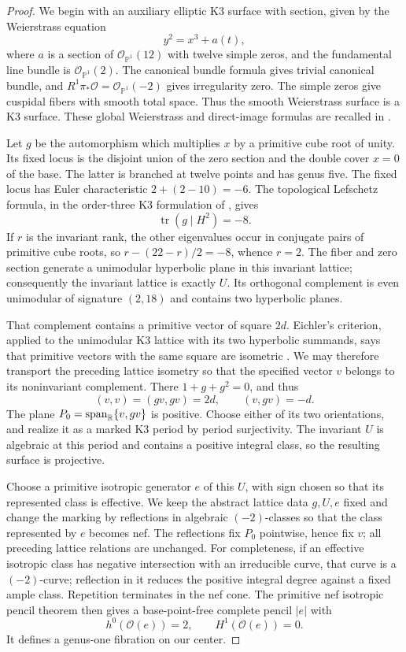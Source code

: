 \begin{proof}
We begin with an auxiliary elliptic K3 surface with section, given by
the Weierstrass equation
\[
 y^2=x^3+a(t),
\]
where $a$ is a section of $\mathcal O_{\mathbb P^1}(12)$ with twelve
simple zeros, and the fundamental line bundle is
$\mathcal O_{\mathbb P^1}(2)$. The canonical bundle formula gives
trivial canonical bundle, and
$R^1\pi_*\mathcal O=\mathcal O_{\mathbb P^1}(-2)$ gives irregularity
zero. The simple zeros give cuspidal fibers with smooth total space.
Thus the smooth Weierstrass surface is a K3 surface. These global
Weierstrass and direct-image formulas are recalled in
\cite[Chapter~11, Sections~1--2]{Huybrechts}.

Let $g$ be the automorphism which multiplies $x$ by a primitive cube
root of unity. Its fixed locus is the disjoint union of the zero
section and the double cover $x=0$ of the base. The latter is branched
at twelve points and has genus five. The fixed locus has Euler
characteristic $2+(2-10)=-6$. The topological Lefschetz formula, in the order-three K3 formulation
of \cite[proof of Theorem~2.2]{ArtebaniSarti}, gives
\[
 \operatorname{tr}(g\mid H^2)=-8.
\]
If $r$ is the invariant rank, the other eigenvalues occur in conjugate
pairs of primitive cube roots, so
$r-(22-r)/2=-8$, whence $r=2$. The fiber and zero section generate a
unimodular hyperbolic plane in this invariant lattice; consequently
the invariant lattice is exactly $U$. Its orthogonal complement is
even unimodular of signature $(2,18)$ and contains two hyperbolic
planes.

That complement contains a primitive vector of square $2d$.
Eichler's criterion, applied to the unimodular K3 lattice with its
two hyperbolic summands, says that primitive vectors with the same
square are isometric \cite{Eichler}. We may therefore transport the
preceding lattice isometry so that the specified vector $v$ belongs
to its noninvariant complement. There
$1+g+g^2=0$, and thus
\[
 (v,v)=(gv,gv)=2d,\qquad (v,gv)=-d.
\]
The plane $P_0=\operatorname{span}_{\mathbb R}\{v,gv\}$ is positive. Choose
either of its two orientations, and realize it as a marked K3 period
by period surjectivity. The invariant $U$ is algebraic at this period
and contains a positive integral class, so the resulting surface is
projective.

Choose a primitive isotropic generator $e$ of this $U$, with sign
chosen so that its represented class is effective. We keep the abstract
lattice data $g,U,e$ fixed and change the marking by reflections in
algebraic $(-2)$-classes so that the class represented by $e$ becomes
nef. The reflections fix $P_0$ pointwise, hence fix $v$; all preceding
lattice relations are unchanged.
For completeness, if an effective isotropic class has negative
intersection with an irreducible curve, that curve is a $(-2)$-curve;
reflection in it reduces the positive integral degree against a
fixed ample class. Repetition terminates in the nef cone. The
primitive nef isotropic pencil theorem then gives a base-point-free
complete pencil $|e|$ with
\[
 h^0(\mathcal O(e))=2,\qquad H^1(\mathcal O(e))=0.
\]
It defines a genus-one fibration on our center.


\end{proof}
